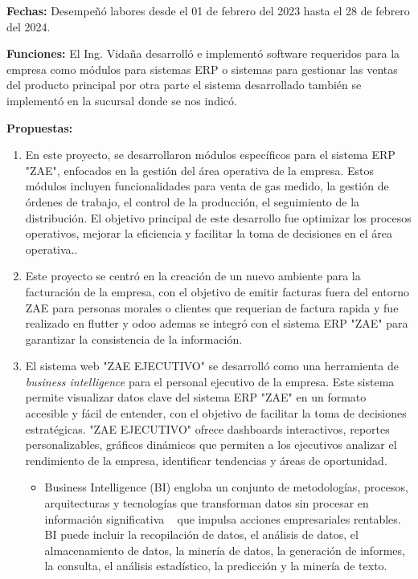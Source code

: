 \documentclass[protocolo.tex]{subfiles}
\begin{document}
\textbf{Fechas:}
Desempeñó labores desde el 01 de febrero del 2023 hasta el 28 de febrero del 2024.


\textbf{Funciones:}
El Ing. Vidaña desarrolló e implementó software requeridos para la empresa como módulos para
sistemas ERP o sistemas para gestionar las ventas del producto principal por otra parte el
sistema desarrollado también se implementó en la sucursal donde se nos indicó.


\textbf{Propuestas:}
\begin{enumerate}
\item En este proyecto,  se  desarrollaron  módulos  específicos  para  el  sistema  ERP  "ZAE",  enfocados  en  la  gestión  del  área  operativa  de  la  empresa.  Estos  módulos  incluyen  funcionalidades  para  venta de gas medido, la gestión de órdenes de trabajo, el control de la producción, el seguimiento de la distribución.  El  objetivo  principal  de  este  desarrollo  fue  optimizar  los  procesos  operativos,  mejorar  la  eficiencia  y  facilitar  la  toma  de  decisiones  en  el  área  operativa..
\item Este proyecto se centró en la creación de un nuevo ambiente para la facturación de la empresa,  con el objetivo de emitir facturas fuera del entorno ZAE para personas morales o clientes que requerian de factura rapida y fue realizado en flutter y odoo ademas  se  integró  con  el  sistema  ERP  "ZAE"  para  garantizar  la  consistencia  de  la  información.
\item El sistema web "ZAE EJECUTIVO" se  desarrolló  como  una  herramienta  de  \textit{business intelligence}  para  el  personal  ejecutivo  de  la  empresa.  Este  sistema  permite  visualizar  datos  clave  del  sistema  ERP  "ZAE"  en  un  formato  accesible  y  fácil  de  entender,  con  el  objetivo  de  facilitar  la  toma  de  decisiones  estratégicas.  "ZAE  EJECUTIVO"  ofrece dashboards interactivos, reportes personalizables, gráficos dinámicos que  permiten  a  los  ejecutivos  analizar  el  rendimiento  de  la  empresa,  identificar  tendencias  y  áreas  de  oportunidad.

\begin{itemize}
    \item Business Intelligence (BI) engloba un conjunto de metodologías, procesos, arquitecturas y tecnologías que transforman datos sin procesar en información significativa   
     que impulsa acciones empresariales rentables. BI puede incluir la recopilación de datos, el análisis de datos, el almacenamiento de datos, la minería de datos, la generación de informes, la consulta, el análisis estadístico, la predicción y la minería de texto. \cite{turban2010}
\end{itemize}
    

\end{enumerate}
\end{document}
